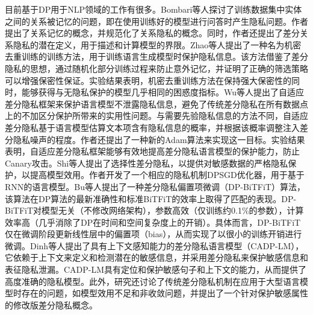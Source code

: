 目前基于DP用于NLP领域的工作有很多。Bombari等人\cite{bombari2022towards}探讨了训练数据集中实体之间的关系被记忆的问题，即在使用训练好的模型进行问答时产生隐私问题。作者提出了关系记忆的概念，并规范化了关系隐私的概念。同时，作者还提出了差分关系隐私的潜在定义，用于描述和计算模型的界限。Zhao等人\cite{zhao2022provably}提出了一种名为机密去重训练的训练方法，用于训练语言生成模型时保护隐私信息。该方法借鉴了差分隐私的思想，通过随机化部分训练过程来防止意外记忆，并证明了正确的筛选策略可以增强保密性保证。实验结果表明，机密去重训练方法在保持强大保密性的同时，能够获得与无隐私保护的模型几乎相同的困惑度指标。Wu等人\cite{DPSSGD}提出了自适应差分隐私框架来保护语言模型不泄露隐私信息，避免了传统差分隐私在所有数据点上的不加区分保护所带来的实用性问题。与需要先验隐私信息的方法不同，自适应差分隐私基于语言模型估算文本项含有隐私信息的概率，并根据该概率调整注入差分隐私噪声的程度。作者还提出了一种新的Adam算法来实现这一目标。实验结果表明，自适应差分隐私框架能够有效地提高差分隐私语言模型的保护能力，防止Canary攻击。Shi等人\cite{selectivedp}提出了选择性差分隐私，以提供对敏感数据的严格隐私保护，以提高模型效用。作者开发了一个相应的隐私机制DPSGD优化器，用于基于RNN的语言模型。Bu等人\cite{DPBiTFiT}提出了一种差分隐私偏置项微调（DP-BiTFiT）算法，该算法在DP算法的最新准确性和标准BiTFiT的效率上取得了匹配的表现。DP-BiTFiT对模型无关（不修改网络架构），参数高效（仅训练约0.1\%的参数），计算效率高（几乎消除了DP在时间和空间复杂度上的开销）。具体而言，DP-BiTFiT仅在微调阶段更新线性层中的偏置项（bias），从而实现了以很小的训练开销进行微调。Dinh等人\cite{CADPLM}提出了具有上下文感知能力的差分隐私语言模型（CADP-LM），它依赖于上下文来定义和检测潜在的敏感信息，并采用差分隐私来保护敏感信息和表征隐私泄漏。CADP-LM具有定位和保护敏感句子和上下文的能力，从而提供了高度准确的隐私模型。此外，研究还讨论了传统差分隐私机制在应用于大型语言模型时存在的问题，如模型效用不足和非收敛问题，并提出了一个针对保护敏感属性的修改版差分隐私概念。



